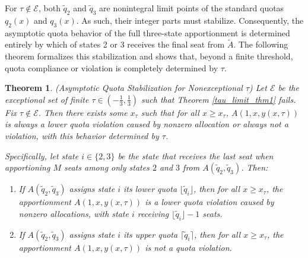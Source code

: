 \documentclass[11pt]{article}
\newtheorem{theorem}{Theorem}[section]
\theoremstyle{definition}
\theoremstyle{definition}
\begin{document}
For $\tau \not \in \mathcal{E}$, both $\tilde{q}_2$ and $\tilde{q}_3$ are nonintegral limit points of the standard quotas $q_2(x)$ and $q_3(x)$. As such, their integer parts must stabilize. Consequently, the asymptotic quota behavior of the full three-state apportionment is determined entirely by which of states 2 or 
3 receives the final seat from $\tilde{A}.$ The following theorem formalizes this stabilization and shows that, beyond a finite threshold, quota compliance or violation is completely determined by $\tau$.

\begin{theorem}\label{X_tau_def/exist} (Asymptotic Quota Stabilization for Nonexceptional $\tau$) Let $\mathcal{E}$ be the exceptional set of finite $\tau \in (-\frac 13,\frac 13)$ such that Theorem \ref{tau_limit_thm1} fails. Fix $\tau \notin \mathcal{E}$. Then there exists some $x_\tau$ such that for all $x \geq x_\tau$, $A(1,x,y(x,\tau))$ is always a lower quota violation caused by nonzero allocation or always not a violation, with this behavior determined by $\tau$. 

Specifically, let state $i \in \{2,3\}$ be the state that receives the last seat when apportioning $M$ seats among only states $2$ and $3$ from $A(\tilde{q}_2, \tilde{q}_3)$. 
Then: 
\begin{enumerate}
 \item If $A(\tilde{q}_2, \tilde{q}_3)$ assigns state $i$ its lower quota 
 $\lfloor \tilde{q}_i \rfloor$, then for all $x \geq x_\tau$, the apportionment 
 $A(1, x, y(x,\tau))$ is a lower quota violation caused by nonzero allocations, 
 with state $i$ receiving $\lfloor \tilde{q}_i \rfloor - 1$ seats.
 \item If $A(\tilde{q}_2, \tilde{q}_3)$ assigns state $i$ its upper quota 
 $\lceil \tilde{q}_i \rceil$, then for all $x \geq x_\tau$, the apportionment 
 $A(1, x, y(x,\tau))$ is not a quota violation.
\end{enumerate}
\end{theorem}
\end{document}
